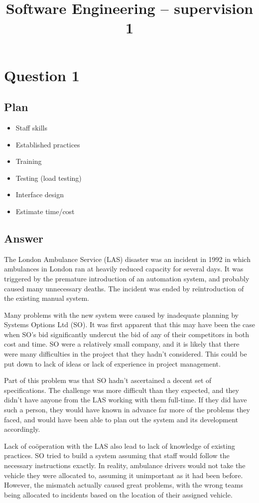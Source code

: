 \documentclass{article}
\begin{document}
\title{Software Engineering -- supervision 1}

\section{Question 1}
\subsection{Plan}
\begin{itemize}
\item Staff skills
\item Established practices
\item Training
\item Testing (load testing)
\item Interface design
\item Estimate time/cost
\end{itemize}

\subsection{Answer}
The London Ambulance Service (LAS) disaster was an incident in 1992 in which ambulances in London ran at heavily reduced capacity for several days. It was triggered by the premature introduction of an automation system, and probably caused many unnecessary deaths. The incident was ended by re\"introduction of the existing manual system.

Many problems with the new system were caused by inadequate planning by Systems Options Ltd (SO). It was first apparent that this may have been the case when SO's bid significantly undercut the bid of any of their competitors in both cost and time. SO were a relatively small company, and it is likely that there were many difficulties in the project that they hadn't considered. This could be put down to lack of ideas or lack of experience in project management.

Part of this problem was that SO hadn't ascertained a decent set of specifications. The challenge was more difficult than they expected, and they didn't have anyone from the LAS working with them full-time. If they did have such a person, they would have known in advance far more of the problems they faced, and would have been able to plan out the system and its development accordingly.

Lack of co\"operation with the LAS also lead to lack of knowledge of existing practices. SO tried to build a system assuming that staff would follow the necessary instructions exactly. In reality, ambulance drivers would not take the vehicle they were allocated to, assuming it unimportant as it had been before. However, the mismatch actually caused great problems, with the wrong teams being allocated to incidents based on the location of their assigned vehicle.
\end{document}
